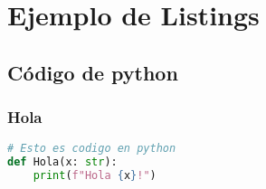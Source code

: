 \section{Ejemplo de Listings}
\subsection{Código de python}
\subsubsection{Hola}
\begin{lstlisting}[language = python]
# Esto es codigo en python
def Hola(x: str):
    print(f"Hola {x}!")
\end{lstlisting}